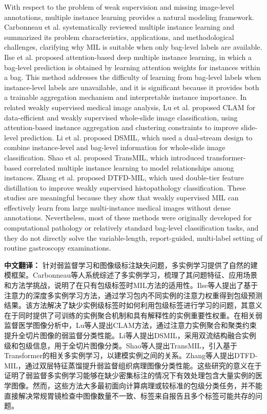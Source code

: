 \documentclass[Afour,sagev,times]{sagej}
\begin{document}
With respect to the problem of weak supervision and missing image-level annotations, multiple instance learning provides a natural modeling framework. Carbonneau et al. systematically reviewed multiple instance learning and summarized its problem characteristics, applications, and methodological challenges, clarifying why MIL is suitable when only bag-level labels are available.\cite{R13} Ilse et al. proposed attention-based deep multiple instance learning, in which a bag-level prediction is obtained by learning attention weights for instances within a bag. This method addresses the difficulty of learning from bag-level labels when instance-level labels are unavailable, and it is significant because it provides both a trainable aggregation mechanism and interpretable instance importance. In related weakly supervised medical image analysis, Lu et al. proposed CLAM for data-efficient and weakly supervised whole-slide image classification, using attention-based instance aggregation and clustering constraints to improve slide-level prediction. Li et al. proposed DSMIL, which used a dual-stream design to combine instance-level and bag-level information for whole-slide image classification. Shao et al. proposed TransMIL, which introduced transformer-based correlated multiple instance learning to model relationships among instances. Zhang et al. proposed DTFD-MIL, which used double-tier feature distillation to improve weakly supervised histopathology classification. These studies are meaningful because they show that weakly supervised MIL can effectively learn from large multi-instance medical images without dense annotations. Nevertheless, most of these methods were originally developed for computational pathology or relatively standard bag-level classification tasks, and they do not directly solve the variable-length, report-guided, multi-label setting of routine gastroscopy examinations.

\textbf{中文翻译：} 针对弱监督学习和图像级标注缺失问题，多实例学习提供了自然的建模框架。Carbonneau等人系统综述了多实例学习，梳理了其问题特征、应用场景和方法学挑战，说明了在只有包级标签时MIL方法的适用性。Ilse等人提出了基于注意力的深度多实例学习方法，通过学习包内不同实例的注意力权重得到包级预测结果。该方法解决了缺少实例级标签时如何利用包级标签进行学习的问题，其意义在于同时提供了可训练的实例聚合机制和具有解释性的实例重要性权重。在相关弱监督医学图像分析中，Lu等人提出CLAM方法，通过注意力实例聚合和聚类约束提升全切片图像的弱监督分类性能。Li等人提出DSMIL，采用双流结构融合实例级和包级信息，用于全切片图像分类。Shao等人提出TransMIL，引入基于Transformer的相关多实例学习，以建模实例之间的关系。Zhang等人提出DTFD-MIL，通过双层特征蒸馏提升弱监督组织病理图像分类性能。这些研究的意义在于证明了弱监督多实例学习能够在缺少密集标注的情况下有效处理包含大量实例的医学图像。然而，这些方法大多最初面向计算病理或较标准的包级分类任务，并不能直接解决常规胃镜检查中图像数量不一致、标签来自报告且多个标签可能共存的问题。
\end{document}
